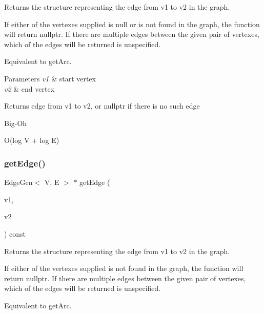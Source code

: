 Returns the structure representing the edge from v1 to v2 in the graph. 

If either of the vertexes supplied is null or is not found in the graph, the function will return nullptr. If there are multiple edges between the given pair of vertexes, which of the edges will be returned is unspecified.

Equivalent to get\+Arc.


\begin{DoxyParams}{Parameters}
{\em v1} & start vertex \\
\hline
{\em v2} & end vertex \\
\hline
\end{DoxyParams}
\begin{DoxyReturn}{Returns}
edge from v1 to v2, or nullptr if there is no such edge 
\end{DoxyReturn}
\begin{DoxyRefDesc}{Big-\/\+Oh}
\item[\mbox{\hyperlink{BigOh__BigOh000017}{Big-\/\+Oh}}]O(log V + log E) \end{DoxyRefDesc}
\mbox{\label{classBasicGraphGen_a57e156a4bae200f10f36fce5ec7fe504}} 
\subsubsection{\texorpdfstring{get\+Edge()}{getEdge()}\hspace{0.1cm}{\footnotesize\ttfamily [2/2]}}
{\footnotesize\ttfamily Edge\+Gen$<$ V, E $>$ $\ast$ get\+Edge (\begin{DoxyParamCaption}\item[{const std\+::string \&}]{v1,  }\item[{const std\+::string \&}]{v2 }\end{DoxyParamCaption}) const}



Returns the structure representing the edge from v1 to v2 in the graph. 

If either of the vertexes supplied is not found in the graph, the function will return nullptr. If there are multiple edges between the given pair of vertexes, which of the edges will be returned is unspecified.

Equivalent to get\+Arc.



